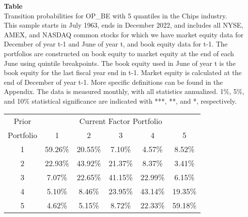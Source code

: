 \begin{table*}[ht!]
\raggedright
{}
\label{tab: transition_probs_OP_BE_Chips_with_5_quantiles}
\textbf{Table \thetable} \\
Transition probabilities for OP_BE with 5 quantiles in the Chips industry. \\
\hspace*{1em}This sample starts in July 1963, ends in December 2022, and includes all NYSE, AMEX, and NASDAQ common stocks for which we have market equity data for December of year t-1 and June of year t, and book equity data for t-1. The portfolios are constructed on book equity to market equity at the end of each June using quintile breakpoints.  The book equity used in June of year t is the book equity for the last fiscal year end in t-1.  Market equity is calculated at the end of December of year t-1.  More specific definitions can be found in the Appendix.  The data is measured monthly, with all statistics annualized.  1\%, 5\%, and 10\% statistical significance are indicated with ***, **, and *, respectively. \\
\vspace{0.5em}
\centering
\begin{adjustbox}{max width=\textwidth}
\begin{tabular}{@{}cccccc@{}}
\toprule
Prior & \multicolumn{5}{c}{Current Factor Portfolio} \\
Portfolio & 1 & 2 & 3 & 4 & 5 \\
\midrule
1 & 59.26\% & 20.55\% & 7.10\% & 4.57\% & 8.52\% \\
2 & 22.93\% & 43.92\% & 21.37\% & 8.37\% & 3.41\% \\
3 & 7.07\% & 22.65\% & 41.15\% & 22.99\% & 6.15\% \\
4 & 5.10\% & 8.46\% & 23.95\% & 43.14\% & 19.35\% \\
5 & 4.62\% & 5.15\% & 8.72\% & 22.33\% & 59.18\% \\
\bottomrule
\end{tabular}
\end{adjustbox}
\end{table*}